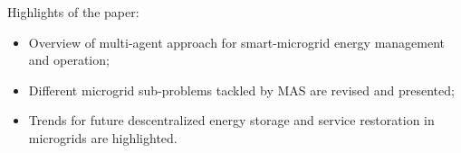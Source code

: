\documentclass[preprint,12pt]{elsarticle}
\begin{document}
\thispagestyle{empty}
Highlights of the paper:

\begin{itemize}
 \item Overview of multi-agent approach for smart-microgrid energy management and operation;
 \item Different microgrid sub-problems tackled by MAS are revised and presented;
 \item Trends for future descentralized energy storage and service restoration in microgrids are highlighted.
\end{itemize}
\end{document}
